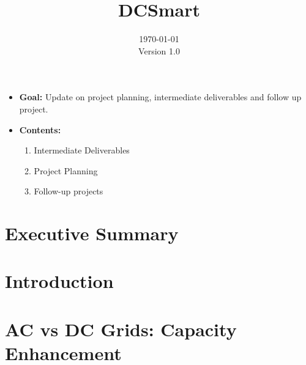 \documentclass[]{scrartcl}
\title{DCSmart}
\date{\today\\Version 1.0}
\begin{document}
\vfill
	\begingroup
	\let\center\flushleft
	\let\endcenter\endflushleft
  \maketitle
	\endgroup
	\vfill
  \newpage
	\section*{}
	\begin{itemize}
		\item \textbf{Goal:} \subitem Update on project planning, intermediate deliverables and follow up project.
		
		\item \textbf{Contents:}
		\begin{enumerate} 
			\item Intermediate Deliverables
			\item Project Planning  
			\item Follow-up projects
		\end{enumerate}
	\end{itemize}

\newpage
\section{Executive Summary}

\section{Introduction}


\section{AC vs DC Grids: Capacity Enhancement}
\end{document}
